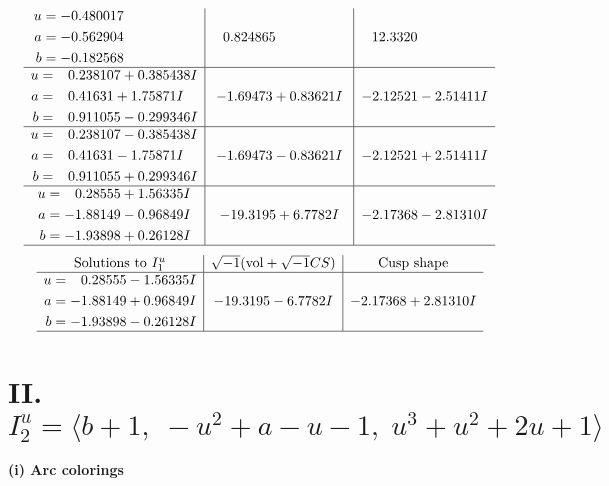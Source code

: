 \documentclass[1p]{elsarticle_modified}
\theoremstyle{definition}
\newcommand{\I}{\sqrt{-1}}
\begin{document}
$$\begin{array}{c|c|c}
\begin{aligned}
u &= -0.480017\phantom{ +0.000000I} \\
a &= -0.562904\phantom{ +0.000000I} \\
b &= -0.182568\phantom{ +0.000000I}\end{aligned}
 & \phantom{-}0.824865\phantom{ +0.000000I} & \phantom{-}12.3320\phantom{ +0.000000I} \\ \hline\begin{aligned}
u &= \phantom{-}0.238107 + 0.385438 I \\
a &= \phantom{-}0.41631 + 1.75871 I \\
b &= \phantom{-}0.911055 - 0.299346 I\end{aligned}
 & -1.69473 + 0.83621 I & -2.12521 - 2.51411 I \\ \hline\begin{aligned}
u &= \phantom{-}0.238107 - 0.385438 I \\
a &= \phantom{-}0.41631 - 1.75871 I \\
b &= \phantom{-}0.911055 + 0.299346 I\end{aligned}
 & -1.69473 - 0.83621 I & -2.12521 + 2.51411 I \\ \hline\begin{aligned}
u &= \phantom{-}0.28555 + 1.56335 I \\
a &= -1.88149 - 0.96849 I \\
b &= -1.93898 + 0.26128 I\end{aligned}
 & -19.3195 + 6.7782 I & -2.17368 - 2.81310 I\\
 \hline 
 \end{array}$$\newpage$$\begin{array}{c|c|c}  
\text{Solutions to }I^u_{1}& \I (\text{vol} + \sqrt{-1}CS) & \text{Cusp shape}\\
 \hline 
\begin{aligned}
u &= \phantom{-}0.28555 - 1.56335 I \\
a &= -1.88149 + 0.96849 I \\
b &= -1.93898 - 0.26128 I\end{aligned}
 & -19.3195 - 6.7782 I & -2.17368 + 2.81310 I\\
 \hline 
 \end{array}$$\newpage\newpage\renewcommand{\arraystretch}{1}
\centering \section*{II. $I^u_{2}= \langle b+1,\;- u^2+a- u-1,\;u^3+u^2+2 u+1 \rangle$}
\flushleft \textbf{(i) Arc colorings}\\
\end{document}
